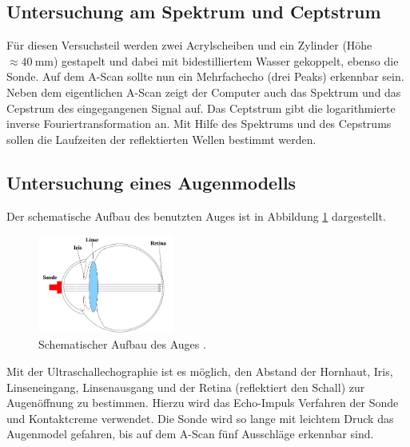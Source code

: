 \subsection{Untersuchung am Spektrum und Ceptstrum}

Für diesen Versuchsteil werden zwei Acrylscheiben und ein Zylinder (Höhe $\approx \SI{40}{\milli\meter}$)
gestapelt und dabei mit bidestilliertem Wasser gekoppelt, ebenso die Sonde.
Auf dem A-Scan sollte nun ein Mehrfachecho (drei Peaks) erkennbar sein.
Neben dem eigentlichen A-Scan zeigt der Computer auch das Spektrum und das Cepstrum des
eingegangenen Signal auf. %
Das Ceptstrum gibt die logarithmierte inverse Fouriertransformation an.
Mit Hilfe des Spektrums und des Cepstrums sollen die Laufzeiten der reflektierten Wellen
bestimmt werden.

\subsection{Untersuchung eines Augenmodells}

Der schematische Aufbau des benutzten Auges ist in Abbildung \ref{fig: auge} dargestellt.
\begin{figure}[h]
  \centering
  \includegraphics[width=0.4\textwidth]{pics/auge.png}
  \caption{Schematischer Aufbau des Auges \cite{anleitungus1}.}
  \label{fig: auge}
\end{figure}
Mit der Ultraschallechographie ist es möglich, den Abstand der Hornhaut, Iris, Linseneingang, Linsenausgang
und der Retina (reflektiert den Schall) zur Augenöffnung zu bestimmen.
Hierzu wird das Echo-Impuls Verfahren der Sonde und Kontaktcreme verwendet.
Die Sonde wird so lange mit leichtem Druck das Augenmodel gefahren, bis auf dem
A-Scan fünf Ausschläge erkennbar sind.
